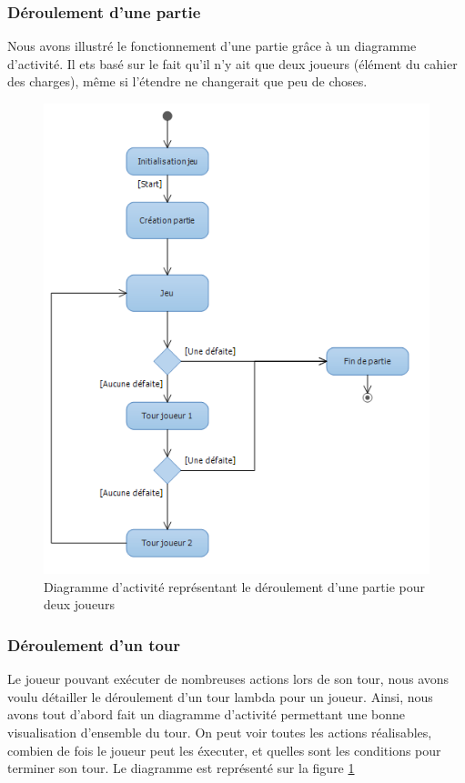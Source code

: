 \subsubsection{Déroulement d'une partie}
Nous avons illustré le fonctionnement d'une partie grâce à un diagramme d'activité. Il ets basé sur le fait qu'il n'y ait que deux joueurs (élément du cahier des charges), même si l'étendre ne changerait que peu de choses.
\begin{figure}[!h] 
\centerline{\includegraphics[width=\textwidth]{img/activite_jeu_ex.png}}
   \caption{\label{étiquette} Diagramme d'activité représentant le déroulement d'une partie pour deux joueurs}
\label{activiteTour}
\end{figure}

\subsubsection{Déroulement d'un tour}
Le joueur pouvant exécuter de nombreuses actions lors de son tour, nous avons voulu détailler le déroulement d'un tour lambda pour un joueur. Ainsi, nous avons tout d'abord fait un diagramme d'activité permettant une bonne visualisation d'ensemble du tour. On peut voir toutes les actions réalisables, combien de fois le joueur peut les éxecuter, et quelles sont les conditions pour terminer son tour. Le diagramme est représenté sur la figure \ref{activiteTour}

